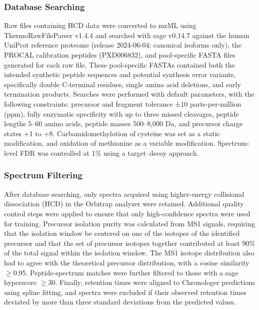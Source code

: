 \documentclass[pdflatex,sn-nature]{sn-jnl}
\begin{document}
\subsubsection{Database Searching}
Raw files containing HCD data were converted to mzML using ThermoRawFileParser v1.4.4 and searched with sage v0.14.7 against the human UniProt reference proteome (release 2024-06-04; canonical isoforms only), the PROCAL calibration peptides (PXD006832), and pool-specific FASTA files generated for each raw file. These pool-specific FASTAs contained both the intended synthetic peptide sequences and potential synthesis error variants, specifically double C-terminal residues, single amino acid deletions, and early termination products.
Searches were performed with default parameters, with the following constraints: precursor and fragment tolerance ±10 parts-per-million (ppm), fully enzymatic specificity with up to three missed cleavages, peptide lengths 5–60 amino acids, peptide masses 500–8,000 Da, and precursor charge states +1 to +8. Carbamidomethylation of cysteine was set as a static modification, and oxidation of methionine as a variable modification. Spectrum-level FDR was controlled at 1\% using a target–decoy approach.

\subsubsection{Spectrum Filtering}
After database searching, only spectra acquired using higher-energy collisional dissociation (HCD) in the Orbitrap analyzer were retained. Additional quality control steps were applied to ensure that only high-confidence spectra were used for training. Precursor isolation purity was calculated from MS1 signals, requiring that the isolation window be centered on one of the isotopes of the identified precursor and that the set of precursor isotopes together contributed at least 90\% of the total signal within the isolation window. The MS1 isotope distribution also had to agree with the theoretical precursor distribution, with a cosine similarity $\geq$0.95. Peptide-spectrum matches were further filtered to those with a sage hyperscore $\geq$30. Finally, retention times were aligned to Chronologer predictions using spline fitting, and spectra were excluded if their observed retention times deviated by more than three standard deviations from the predicted values.
\end{document}
